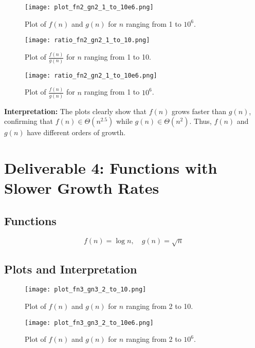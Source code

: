 \documentclass{article}
\begin{document}
\begin{figure}[H]
    \centering
    \texttt{[image: plot\_fn2\_gn2\_1\_to\_10e6.png]}
    \caption{Plot of $f(n)$ and $g(n)$ for $n$ ranging from 1 to $10^6$.}
    \label{fig:fn2_gn2_1_10e6}
\end{figure}

\begin{figure}[H]
    \centering
    \texttt{[image: ratio\_fn2\_gn2\_1\_to\_10.png]}
    \caption{Plot of $\frac{f(n)}{g(n)}$ for $n$ ranging from 1 to 10.}
    \label{fig:ratio_fn2_gn2_1_10}
\end{figure}

\begin{figure}[H]
    \centering
    \texttt{[image: ratio\_fn2\_gn2\_1\_to\_10e6.png]}
    \caption{Plot of $\frac{f(n)}{g(n)}$ for $n$ ranging from 1 to $10^6$.}
    \label{fig:ratio_fn2_gn2_1_10e6}
\end{figure}

\textbf{Interpretation:} The plots clearly show that $f(n)$ grows faster than $g(n)$, confirming that $f(n) \in \Theta(n^{2.5})$ while $g(n) \in \Theta(n^2)$. Thus, $f(n)$ and $g(n)$ have different orders of growth.

\section{Deliverable 4: Functions with Slower Growth Rates}

\subsection{Functions}
\[
f(n) = \log n, \quad g(n) = \sqrt{n}
\]

\subsection{Plots and Interpretation}

\begin{figure}[H]
    \centering
    \texttt{[image: plot\_fn3\_gn3\_2\_to\_10.png]}
    \caption{Plot of $f(n)$ and $g(n)$ for $n$ ranging from 2 to 10.}
    \label{fig:fn3_gn3_2_10}
\end{figure}

\begin{figure}[H]
    \centering
    \texttt{[image: plot\_fn3\_gn3\_2\_to\_10e6.png]}
    \caption{Plot of $f(n)$ and $g(n)$ for $n$ ranging from 2 to $10^6$.}
    \label{fig:fn3_gn3_2_10e6}
\end{figure}
\end{document}
